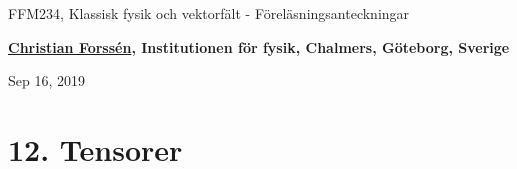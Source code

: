 \documentclass[%
oneside,                 %
final,                   %
10pt]{article}
\begin{document}

\newcommand{\exercisesection}[1]{\subsection*{#1}}







\thispagestyle{empty}

\begin{center}
{\LARGE\bf
\begin{spacing}{1.25}
FFM234, Klassisk fysik och vektorfält - Föreläsningsanteckningar
\end{spacing}
}
\end{center}


\begin{center}
{\bf \href{{http://fy.chalmers.se/subatom/tsp/}}{Christian Forssén}, Institutionen för fysik, Chalmers, Göteborg, Sverige${}^{}$} \\ [0mm]
\end{center}

\begin{center}
\end{center}
    

\begin{center}
Sep 16, 2019
\end{center}

\vspace{1cm}


\section*{12. Tensorer}
\end{document}
